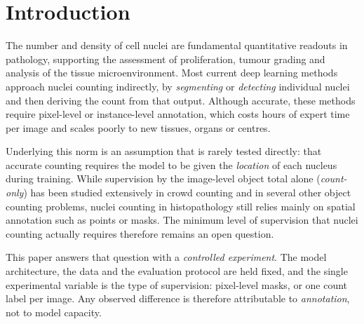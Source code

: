 \documentclass[pdflatex,sn-mathphys-num]{sn-jnl}
\begin{document}
\section{Introduction}\label{sec:intro}

The number and density of cell nuclei are fundamental quantitative readouts in pathology, supporting the
assessment of proliferation, tumour grading and analysis of the tissue microenvironment. Most current deep
learning methods approach nuclei counting indirectly, by \emph{segmenting} or \emph{detecting} individual
nuclei and then deriving the count from that output. Although accurate, these methods require pixel-level or
instance-level annotation, which costs hours of expert time per image and scales poorly to new tissues, organs
or centres.

Underlying this norm is an assumption that is rarely tested directly: that accurate counting requires the model
to be given the \emph{location} of each nucleus during training. While supervision by the image-level object
total alone (\emph{count-only}) has been studied extensively in crowd counting and in several other object
counting problems, nuclei counting in histopathology still relies mainly on spatial annotation such as points
or masks. The minimum level of supervision that nuclei counting actually requires therefore remains an open
question.

This paper answers that question with a \emph{controlled experiment}. The model architecture, the data and the
evaluation protocol are held fixed, and the single experimental variable is the type of supervision:
pixel-level masks, or one count label per image. Any observed difference is therefore attributable to
\emph{annotation}, not to model capacity.
\end{document}
